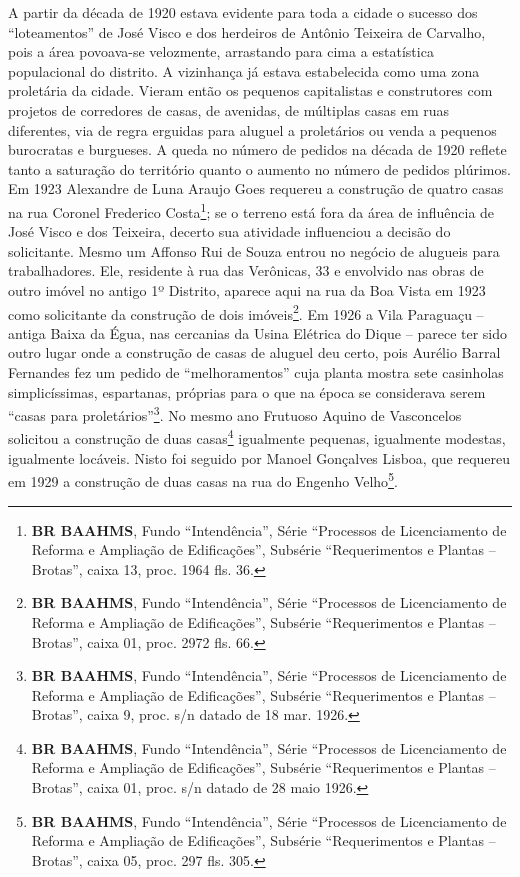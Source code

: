 A partir da década de 1920 estava evidente para toda a cidade o sucesso dos ``loteamentos'' de José Visco e dos herdeiros de Antônio Teixeira de Carvalho, pois a área povoava-se velozmente, arrastando para cima a estatística populacional do distrito. A vizinhança já estava estabelecida como uma zona proletária da cidade. Vieram então os pequenos capitalistas e construtores com projetos de corredores de casas, de avenidas, de múltiplas casas em ruas diferentes, via de regra erguidas para aluguel a proletários ou venda a pequenos burocratas e burgueses. A queda no número de pedidos na década de 1920 reflete tanto a saturação do território quanto o aumento no número de pedidos plúrimos. Em 1923 Alexandre de Luna Araujo Goes requereu a construção de quatro casas na rua Coronel Frederico Costa\footnote{\textbf{BR BAAHMS}, Fundo ``Intendência'', Série ``Processos de Licenciamento de Reforma e Ampliação de Edificações'', Subsérie ``Requerimentos e Plantas -- Brotas'', caixa 13, proc. 1964 fls. 36.}; se o terreno está fora da área de influência de José Visco e dos Teixeira, decerto sua atividade influenciou a decisão do solicitante. Mesmo um Affonso Rui de Souza entrou no negócio de alugueis para trabalhadores. Ele, residente à rua das Verônicas, 33 e envolvido nas obras de outro imóvel no antigo 1º Distrito, aparece aqui na rua da Boa Vista em 1923 como solicitante da construção de dois imóveis\footnote{\textbf{BR BAAHMS}, Fundo ``Intendência'', Série ``Processos de Licenciamento de Reforma e Ampliação de Edificações'', Subsérie ``Requerimentos e Plantas -- Brotas'', caixa 01, proc. 2972 fls. 66.}. Em 1926 a Vila Paraguaçu -- antiga Baixa da Égua, nas cercanias da Usina Elétrica do Dique \cite[p.~104]{souza_guia_1935} -- parece ter sido outro lugar onde a construção de casas de aluguel deu certo, pois Aurélio Barral Fernandes fez um pedido de ``melhoramentos'' cuja planta mostra sete casinholas simplicíssimas, espartanas, próprias para o que na época se considerava serem ``casas para proletários''\footnote{\textbf{BR BAAHMS}, Fundo ``Intendência'', Série ``Processos de Licenciamento de Reforma e Ampliação de Edificações'', Subsérie ``Requerimentos e Plantas -- Brotas'', caixa 9, proc. s/n datado de 18 mar. 1926.}. No mesmo ano Frutuoso Aquino de Vasconcelos solicitou a construção de duas casas\footnote{\textbf{BR BAAHMS}, Fundo ``Intendência'', Série ``Processos de Licenciamento de Reforma e Ampliação de Edificações'', Subsérie ``Requerimentos e Plantas -- Brotas'', caixa 01, proc. s/n datado de 28 maio 1926.} igualmente pequenas, igualmente modestas, igualmente locáveis. Nisto foi seguido por Manoel Gonçalves Lisboa, que requereu em 1929 a construção de duas casas na rua do Engenho Velho\footnote{\textbf{BR BAAHMS}, Fundo ``Intendência'', Série ``Processos de Licenciamento de Reforma e Ampliação de Edificações'', Subsérie ``Requerimentos e Plantas -- Brotas'', caixa 05, proc. 297 fls. 305.}.

